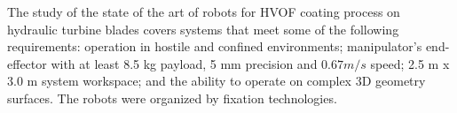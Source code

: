 The study of the state of the art of robots for HVOF coating process on
hydraulic turbine blades covers systems that meet some of the following
requirements:
operation in hostile and confined environments; manipulator's end-effector with
at least 8.5 kg payload, 5 mm precision and $0.67 m/s$ speed; 2.5 m x 3.0 m
system workspace; and the ability to operate on complex 3D geometry surfaces.
The robots were organized by fixation technologies.



